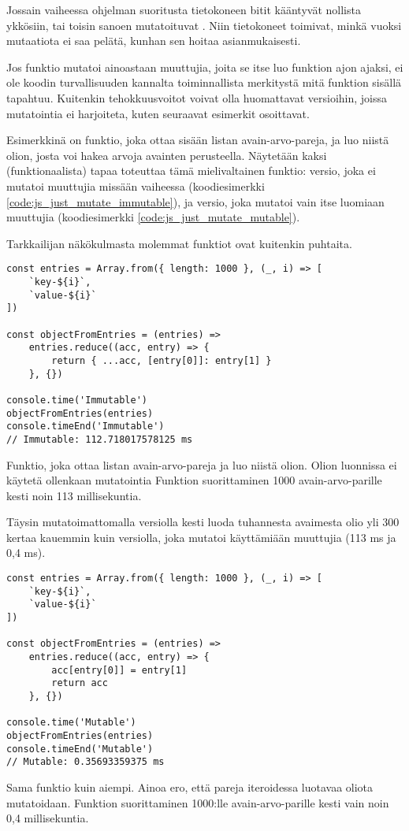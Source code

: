 Jossain vaiheessa ohjelman suoritusta tietokoneen bitit kääntyvät nollista ykkösiin, tai toisin sanoen mutatoituvat \cite{is_reduce_bad}. Niin tietokoneet toimivat, minkä vuoksi mutaatiota ei saa pelätä, kunhan sen hoitaa asianmukaisesti.

Jos funktio mutatoi ainoastaan muuttujia, joita se itse luo funktion ajon ajaksi, ei ole koodin turvallisuuden kannalta toiminnallista merkitystä mitä funktion sisällä tapahtuu. Kuitenkin tehokkuusvoitot voivat olla huomattavat versioihin, joissa mutatointia ei harjoiteta, kuten seuraavat esimerkit osoittavat.

Esimerkkinä on funktio, joka ottaa sisään listan avain-arvo-pareja, ja luo niistä olion, josta voi hakea arvoja avainten perusteella. Näytetään kaksi (funktionaalista) tapaa toteuttaa tämä mielivaltainen funktio:
versio, joka ei mutatoi muuttujia missään vaiheessa (koodiesimerkki \ref{code:js_just_mutate_immutable}), ja versio, joka mutatoi vain itse luomiaan muuttujia (koodiesimerkki \ref{code:js_just_mutate_mutable}).

Tarkkailijan näkökulmasta molemmat funktiot ovat kuitenkin puhtaita.

\begin{code}
    \begin{verbatim}
const entries = Array.from({ length: 1000 }, (_, i) => [
    `key-${i}`,
    `value-${i}`
])

const objectFromEntries = (entries) =>
    entries.reduce((acc, entry) => {
        return { ...acc, [entry[0]]: entry[1] }
    }, {})

console.time('Immutable')
objectFromEntries(entries)
console.timeEnd('Immutable')
// Immutable: 112.718017578125 ms
\end{verbatim}
    \caption{Funktio, joka ottaa listan avain-arvo-pareja ja luo niistä olion. Olion luonnissa ei käytetä ollenkaan mutatointia Funktion suorittaminen 1000 avain-arvo-parille kesti noin 113 millisekuntia.}
    \label{code:js_just_mutate_immutable}
\end{code}

Täysin mutatoimattomalla versiolla kesti luoda tuhannesta avaimesta olio yli 300 kertaa kauemmin kuin versiolla, joka mutatoi käyttämiään muuttujia (113 ms ja 0,4 ms).


\begin{code}
    \begin{verbatim}
const entries = Array.from({ length: 1000 }, (_, i) => [
    `key-${i}`,
    `value-${i}`
])

const objectFromEntries = (entries) =>
    entries.reduce((acc, entry) => {
        acc[entry[0]] = entry[1]
        return acc
    }, {})
          
console.time('Mutable')
objectFromEntries(entries)
console.timeEnd('Mutable')
// Mutable: 0.35693359375 ms
\end{verbatim}
    \caption{Sama funktio kuin aiempi. Ainoa ero, että pareja iteroidessa luotavaa oliota mutatoidaan. Funktion suorittaminen 1000:lle avain-arvo-parille kesti vain noin 0,4 millisekuntia.}
    \label{code:js_just_mutate_mutable}
\end{code}

